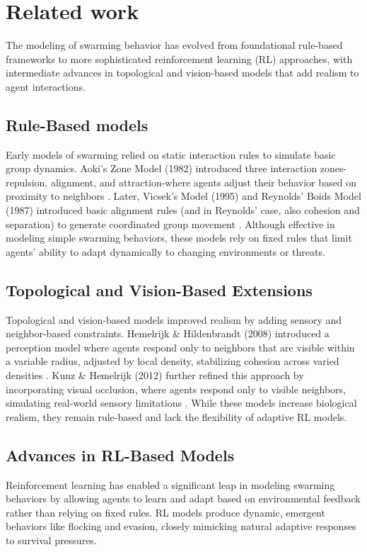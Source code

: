 \documentclass[9pt]{pnas-new}
\begin{document}
\section*{Related work}
The modeling of swarming behavior has evolved from foundational rule-based frameworks to more sophisticated reinforcement learning (RL) approaches, with intermediate advances in topological and vision-based models that add realism to agent interactions.

\subsection{Rule-Based models}
Early models of swarming relied on static interaction rules to simulate basic group dynamics. 
Aoki's Zone Model (1982) introduced three interaction zones-repulsion, alignment, and attraction-where agents adjust their behavior based on proximity to neighbors \cite{aoki1987zones}. 
Later, Vicsek's Model (1995) and Reynolds' Boids Model (1987) introduced basic alignment rules (and in Reynolds' case, also cohesion and separation) to generate coordinated group movement \cite{Vicsek1995}\cite{reynolds1987boids}. 
Although effective in modeling simple swarming behaviors, these models rely on fixed rules that limit agents' ability to adapt dynamically to changing environments or threats.

\subsection{Topological and Vision-Based Extensions}

Topological and vision-based models improved realism by adding sensory and neighbor-based constraints. 
Hemelrijk \& Hildenbrandt (2008) introduced a perception model where agents respond only to neighbors that are visible within a variable radius, adjusted by local density, stabilizing cohesion across varied densities \cite{Hemelrijk2008}. 
Kunz \& Hemelrijk (2012) further refined this approach by incorporating visual occlusion, where agents respond only to visible neighbors, simulating real-world sensory limitations \cite{kunz2012}. While these models increase biological realism, they remain rule-based and lack the flexibility of adaptive RL models.

\subsection{Advances in RL-Based Models}

Reinforcement learning has enabled a significant leap in modeling swarming behaviors by allowing agents to learn and adapt based on environmental feedback rather than relying on fixed rules. RL models produce dynamic, emergent behaviors like flocking and evasion, closely mimicking natural adaptive responses to survival pressures.
\end{document}
